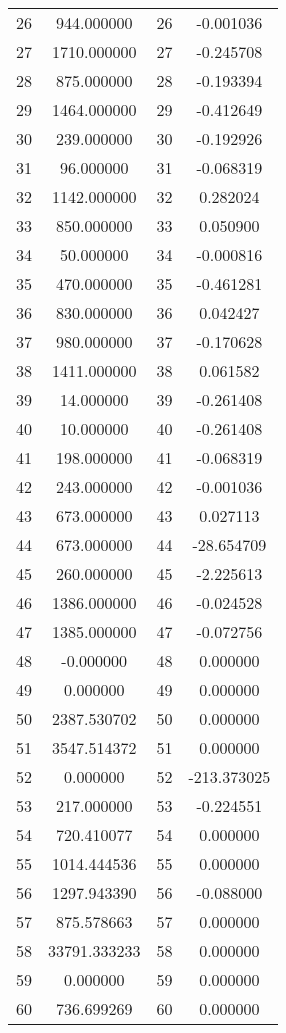 \documentclass[12pt]{article}
\begin{document}
\begin{longtable}{@{}cccc@{}}
26 & 944.000000 & 26 & -0.001036 \\
27 & 1710.000000 & 27 & -0.245708 \\
28 & 875.000000 & 28 & -0.193394 \\
29 & 1464.000000 & 29 & -0.412649 \\
30 & 239.000000 & 30 & -0.192926 \\
31 & 96.000000 & 31 & -0.068319 \\
32 & 1142.000000 & 32 & 0.282024 \\
33 & 850.000000 & 33 & 0.050900 \\
34 & 50.000000 & 34 & -0.000816 \\
35 & 470.000000 & 35 & -0.461281 \\
36 & 830.000000 & 36 & 0.042427 \\
37 & 980.000000 & 37 & -0.170628 \\
38 & 1411.000000 & 38 & 0.061582 \\
39 & 14.000000 & 39 & -0.261408 \\
40 & 10.000000 & 40 & -0.261408 \\
41 & 198.000000 & 41 & -0.068319 \\
42 & 243.000000 & 42 & -0.001036 \\
43 & 673.000000 & 43 & 0.027113 \\
44 & 673.000000 & 44 & -28.654709 \\
45 & 260.000000 & 45 & -2.225613 \\
46 & 1386.000000 & 46 & -0.024528 \\
47 & 1385.000000 & 47 & -0.072756 \\
48 & -0.000000 & 48 & 0.000000 \\
49 & 0.000000 & 49 & 0.000000 \\
50 & 2387.530702 & 50 & 0.000000 \\
51 & 3547.514372 & 51 & 0.000000 \\
52 & 0.000000 & 52 & -213.373025 \\
53 & 217.000000 & 53 & -0.224551 \\
54 & 720.410077 & 54 & 0.000000 \\
55 & 1014.444536 & 55 & 0.000000 \\
56 & 1297.943390 & 56 & -0.088000 \\
57 & 875.578663 & 57 & 0.000000 \\
58 & 33791.333233 & 58 & 0.000000 \\
59 & 0.000000 & 59 & 0.000000 \\
60 & 736.699269 & 60 & 0.000000 \\

\end{longtable}
\end{document}

